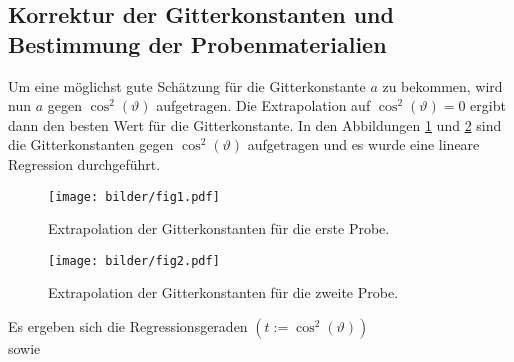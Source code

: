 \subsection{Korrektur der Gitterkonstanten und Bestimmung der Probenmaterialien}
Um eine möglichst gute Schätzung für die Gitterkonstante $a$ zu bekommen, wird nun 
$a$ gegen $\cos^2(\vartheta)$ aufgetragen. Die Extrapolation auf 
$\cos^2(\vartheta)=0$ ergibt dann den besten Wert für die Gitterkonstante. In 
den Abbildungen \ref{fig:1} und \ref{fig:2} sind die Gitterkonstanten gegen 
$\cos^2(\vartheta)$ aufgetragen und es wurde eine lineare Regression durchgeführt.
\begin{figure}[h]
\centering
\texttt{[image: bilder/fig1.pdf]}
\caption{Extrapolation der Gitterkonstanten für die erste Probe.}
\label{fig:1}
\end{figure}
\begin{figure}[h]
\centering
\texttt{[image: bilder/fig2.pdf]}
\caption{Extrapolation der Gitterkonstanten für die zweite Probe.}
\label{fig:2}
\end{figure}
Es ergeben sich die Regressionsgeraden $(t:=\cos^2(\vartheta))$
\begin{equation}

\end{equation}
sowie
\begin{equation}

\end{equation}
